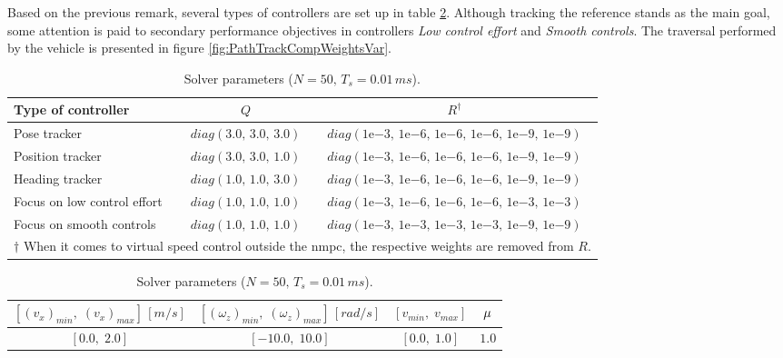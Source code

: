 Based on the previous remark, several types of controllers are set up in table \ref{tab:setsWeights}. Although tracking the reference stands as the main goal, some attention is paid to secondary performance objectives in controllers \textit{Low control effort} and \textit{Smooth controls}. The traversal performed by the vehicle is presented in figure \ref{fig:PathTrackCompWeightsVar}.

\begin{table}[!htb]
  \caption[Constant solver parameters when cost function weights change.]{Solver parameters ($N = 50,\, T_s = 0.01 \, ms$).}
  \label{tab:setsWeights}
  \renewcommand{\arraystretch}{1.2}
  \centering
  \begin{tabular}[]{lcc}
	\toprule
    Type of controller & $Q$ & $R^{\dagger}$\\
	\midrule
    Pose tracker & $diag\left(3.0,\,3.0,\,3.0\right)$ & $diag\left(1\mathrm{e}{-3}
,\, 1\mathrm{e}{-6},\,1\mathrm{e}{-6},\,1\mathrm{e}{-6},\,1\mathrm{e}{-9},\,1\mathrm{e}{-9}\right)$\\
	Position tracker & $diag\left(3.0,\,3.0,\,1.0\right)$ & $diag\left(1\mathrm{e}{-3}
,\, 1\mathrm{e}{-6},\,1\mathrm{e}{-6},\,1\mathrm{e}{-6},\,1\mathrm{e}{-9},\,1\mathrm{e}{-9}\right)$\\
	Heading tracker & $diag\left(1.0,\,1.0,\,3.0\right)$ & $diag\left(1\mathrm{e}{-3}
,\, 1\mathrm{e}{-6},\,1\mathrm{e}{-6},\,1\mathrm{e}{-6},\,1\mathrm{e}{-9},\,1\mathrm{e}{-9}\right)$\\
	Focus on low control effort & $diag\left(1.0,\,1.0,\,1.0\right)$ & $diag\left(1\mathrm{e}{-3}
,\, 1\mathrm{e}{-6},\,1\mathrm{e}{-6},\,1\mathrm{e}{-6},\,1\mathrm{e}{-3},\,1\mathrm{e}{-3}\right)$\\
	Focus on smooth controls & $diag\left(1.0,\,1.0,\,1.0\right)$ & $diag\left(1\mathrm{e}{-3}
,\, 1\mathrm{e}{-3},\,1\mathrm{e}{-3},\,1\mathrm{e}{-3},\,1\mathrm{e}{-9},\,1\mathrm{e}{-9}\right)$\\
	\bottomrule
  	\multicolumn{3}{l}{\footnotesize $\dagger$ When it comes to virtual speed control outside the \acrshort{nmpc}, the respective weights are removed from $R$.}
  \end{tabular}
  \begin{tabular}[]{cccc}
	\toprule
		$\left[(v_x)_{min},\; (v_x)_{max}\right]\,[m/s]$ & $\left[(\omega_z)_{min},\; (\omega_z)_{max}\right]\,[rad/s]$ & $\left[v_{min},\;v_{max}\right]$ & $\mu$\\
	\midrule
		$[0.0,\;2.0]$ & $[-10.0,\;10.0]$ & $[0.0,\;1.0]$ & $1.0$\\
  	\bottomrule
  \end{tabular}
\end{table}

